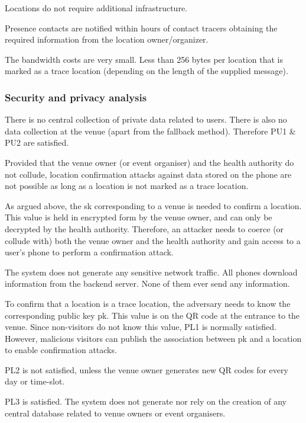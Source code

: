  Locations do not require additional infrastructure.

 Presence contacts are notified within hours of contact tracers obtaining the required information from the location owner/organizer.

 The bandwidth costs are very small. Less than 256 bytes per location that is marked as a trace location (depending on the length of the supplied message).

\subsubsection{Security and privacy analysis}

 There is no central collection of private data related to users. There is also no data collection at the venue (apart from the fallback method). Therefore PU1 \& PU2 are satisfied.

 Provided that the venue owner (or event organiser) and the health authority do not collude, location confirmation attacks against data stored on the phone are not possible as long as a location is not marked as a trace location.

As argued above, the sk corresponding to a venue is needed to confirm a location. This value is held in encrypted form by the venue owner, and can only be decrypted by the health authority. Therefore, an attacker needs to coerce (or collude with) both the venue owner and the health authority and gain access to a user’s phone to perform a confirmation attack.

 The system does not generate any sensitive network traffic. All phones download information from the backend server. None of them ever send any information.

 To confirm that a location is a trace location, the adversary needs to know the corresponding public key pk. This value is on the QR code at the entrance to the venue. Since non-visitors do not know this value, PL1 is normally satisfied. However, malicious visitors can publish the association between pk and a location to enable confirmation attacks.

 PL2 is not satisfied, unless the venue owner generates new QR codes for every day or time-slot.

 PL3 is satisfied. The system does not generate nor rely on the creation of any central database related to venue owners or event organisers.

